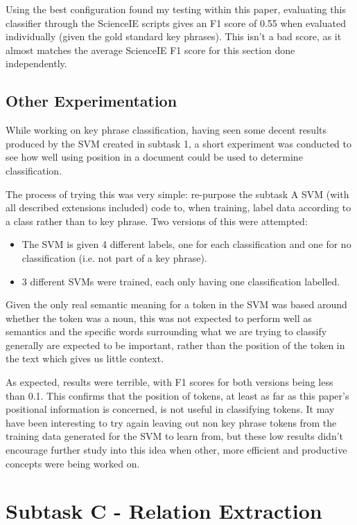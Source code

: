 Using the best configuration found my testing within this paper, evaluating this classifier through the ScienceIE scripts gives an F1 score of 0.55 when evaluated individually (given the gold standard key phrases). This isn't a bad score, as it almost matches the average ScienceIE F1 score for this section done independently.

\subsection*{Other Experimentation}
While working on key phrase classification, having seen some decent results produced by the SVM created in subtask 1, a short experiment was conducted to see how well using position in a document could be used to determine classification.

The process of trying this was very simple: re-purpose the subtask A SVM (with all described extensions included) code to, when training, label data according to a class rather than to key phrase. Two versions of this were attempted:

\begin{itemize}
	\item The SVM is given 4 different labels, one for each classification and one for no classification (i.e. not part of a key phrase).
	\item 3 different SVMs were trained, each only having one classification labelled.
\end{itemize}

Given the only real semantic meaning for a token in the SVM was based around whether the token was a noun, this was not expected to perform well as semantics and the specific words surrounding what we are trying to classify generally are expected to be important, rather than the position of the token in the text which gives us little context.

As expected, results were terrible, with F1 scores for both versions being less than 0.1. This confirms that the position of tokens, at least as far as this paper's positional information is concerned, is not useful in classifying tokens. It may have been interesting to try again leaving out non key phrase tokens from the training data generated for the SVM to learn from, but these low results didn't encourage further study into this idea when other, more efficient and productive concepts were being worked on.

\section{Subtask C - Relation Extraction}

